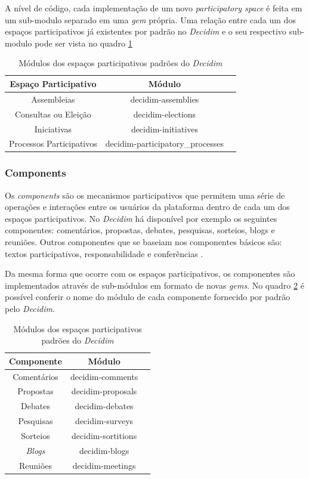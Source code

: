 A nível de código, cada implementação de um novo \textit{participatory space} é feita em um sub-modulo separado em uma \textit{gem} própria. Uma relação entre cada um dos espaços participativos já existentes por padrão no \textit{Decidim} e o seu respectivo sub-modulo pode ser vista no quadro \ref{tab:modulos-participatoryspaces}

\begin{table}
  \centering
  \begin{tabular}{|c|c|c|}
    \hline
    Espaço Participativo & Módulo \\
    \hline
    Assembleias & decidim-assemblies \\
    Consultas ou Eleição & decidim-elections \\
    Iniciativas & decidim-initiatives \\
    Processos Participativos & decidim-participatory\_processes \\
    \hline
  \end{tabular}
  \caption{Módulos dos espaços participativos padrões do \textit{Decidim}}
  \label{tab:modulos-participatoryspaces}
\end{table}

\subsubsection{Components}

Os \textit{components} são os mecanismos participativos que permitem uma série de operações e interações entre os usuários da plataforma dentro de cada um dos espaços participativos. No \textit{Decidim} há disponível por exemplo os seguintes componentes: comentários, propostas, debates, pesquisas, sorteios, blogs e reuniões. Outros componentes que se baseiam nos componentes básicos são: textos participativos, responsabilidade e conferências \cite{decidim-descriptionpage}.

Da mesma forma que ocorre com os espaços participativos, os componentes são implementados através de sub-módulos em formato de novas \textit{gems}. No quadro \ref{tab:modulos-components} é possível conferir o nome do módulo de cada componente fornecido por padrão pelo \textit{Decidim}.

\begin{table}
  \centering
  \begin{tabular}{|c|c|c|}
    \hline
    Componente & Módulo \\
    \hline
    Comentários & decidim-comments \\
    Propostas & decidim-proposals \\
    Debates & decidim-debates \\
    Pesquisas & decidim-surveys \\
    Sorteios & decidim-sortitions \\
    \textit{Blogs} & decidim-blogs \\
    Reuniões & decidim-meetings \\
    \hline
  \end{tabular}
  \caption{Módulos dos espaços participativos padrões do \textit{Decidim}}
  \label{tab:modulos-components}
\end{table}

